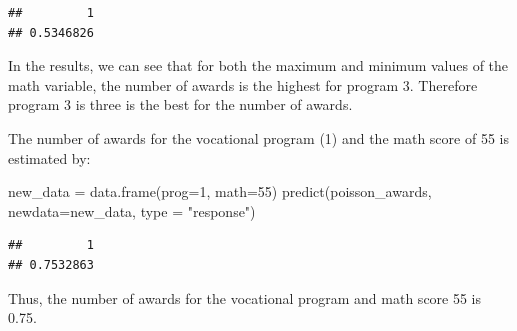 \documentclass[
]{article}
\newenvironment{Shaded}{\begin{snugshade}}{\end{snugshade}}
\newcommand{\AttributeTok}[1]{\textcolor[rgb]{0.77,0.63,0.00}{#1}}
\newcommand{\DecValTok}[1]{\textcolor[rgb]{0.00,0.00,0.81}{#1}}
\newcommand{\FunctionTok}[1]{\textcolor[rgb]{0.00,0.00,0.00}{#1}}
\newcommand{\NormalTok}[1]{#1}
\newcommand{\OtherTok}[1]{\textcolor[rgb]{0.56,0.35,0.01}{#1}}
\newcommand{\StringTok}[1]{\textcolor[rgb]{0.31,0.60,0.02}{#1}}
\begin{document}
\begin{verbatim}
##         1 
## 0.5346826
\end{verbatim}

In the results, we can see that for both the maximum and minimum values
of the math variable, the number of awards is the highest for program 3.
Therefore program 3 is three is the best for the number of awards.

The number of awards for the vocational program (1) and the math score
of 55 is estimated by:

\begin{Shaded}
\begin{Highlighting}[]
\NormalTok{new\_data }\OtherTok{=} \FunctionTok{data.frame}\NormalTok{(}\AttributeTok{prog=}\DecValTok{1}\NormalTok{, }\AttributeTok{math=}\DecValTok{55}\NormalTok{)}
\FunctionTok{predict}\NormalTok{(poisson\_awards, }\AttributeTok{newdata=}\NormalTok{new\_data, }\AttributeTok{type =} \StringTok{"response"}\NormalTok{)}
\end{Highlighting}
\end{Shaded}

\begin{verbatim}
##         1 
## 0.7532863
\end{verbatim}

Thus, the number of awards for the vocational program and math score 55
is 0.75.
\end{document}
